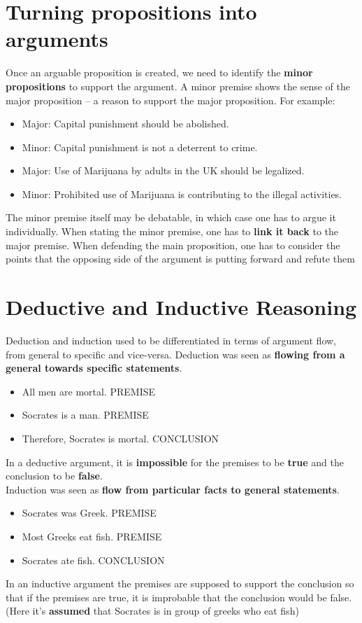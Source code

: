 \documentclass{article}
\begin{document}
\section{Turning propositions into arguments}
\begin{flushleft}
Once an arguable proposition is created, we need to identify the \textbf{minor propositions} to support the argument. A minor premise shows the sense of the major proposition – a reason to support the major proposition. For example:
\end{flushleft}
\begin{itemize}
  \item Major: Capital punishment should be abolished.
  \item Minor: Capital punishment is not a deterrent to crime. 
  \item Major: Use of Marijuana by adults in the UK should be legalized.
  \item Minor: Prohibited use of Marijuana is contributing to the illegal activities. 
\end{itemize}
\begin{flushleft}
The minor premise itself may be debatable, in which case one has to argue it individually. When stating the minor premise, one has to \textbf{link it back} to the major premise. When defending the main proposition, one has to consider the points that the opposing side of the argument is putting forward and refute them
\end{flushleft}

\section{Deductive and Inductive Reasoning}
\begin{flushleft}
Deduction and induction used to be differentiated in terms of argument flow, from general to specific and vice-versa. Deduction was seen as \textbf{flowing from a general towards specific statements}.
\begin{itemize}
  \item All men are mortal. PREMISE
  \item Socrates is a man. PREMISE
  \item Therefore, Socrates is mortal. CONCLUSION
\end{itemize}
In a deductive argument, it is \textbf{impossible} for the premises to be \textbf{true} and the conclusion to be \textbf{false}.\\
Induction was seen as \textbf{flow from particular facts to general statements}.
\begin{itemize}
  \item Socrates was Greek. PREMISE
  \item Most Greeks eat fish. PREMISE
  \item Socrates ate fish. CONCLUSION
\end{itemize}
In an inductive argument the premises are supposed to support the conclusion so that if the premises are true, it is improbable that the conclusion would be false. (Here it's \textbf{assumed} that Socrates is in group of greeks who eat fish)
\end{flushleft}
\end{document}
